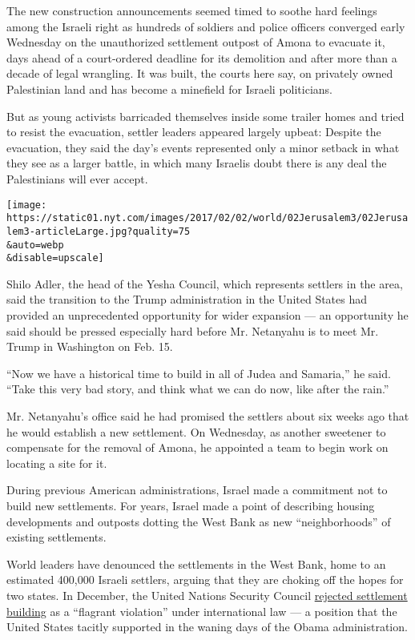 The new construction announcements seemed timed to soothe hard feelings
among the Israeli right as hundreds of soldiers and police officers
converged early Wednesday on the unauthorized settlement outpost of
Amona to evacuate it, days ahead of a court-ordered deadline for its
demolition and after more than a decade of legal wrangling. It was
built, the courts here say, on privately owned Palestinian land and has
become a minefield for Israeli politicians.

But as young activists barricaded themselves inside some trailer homes
and tried to resist the evacuation, settler leaders appeared largely
upbeat: Despite the evacuation, they said the day's events represented
only a minor setback in what they see as a larger battle, in which many
Israelis doubt there is any deal the Palestinians will ever accept.

\texttt{[image: https://static01.nyt.com/images/2017/02/02/world/02Jerusalem3/02Jerusalem3-articleLarge.jpg?quality=75\\\&auto=webp\\\&disable=upscale]}

Shilo Adler, the head of the Yesha Council, which represents settlers in
the area, said the transition to the Trump administration in the United
States had provided an unprecedented opportunity for wider expansion ---
an opportunity he said should be pressed especially hard before Mr.
Netanyahu is to meet Mr. Trump in Washington on Feb. 15.

``Now we have a historical time to build in all of Judea and Samaria,''
he said. ``Take this very bad story, and think what we can do now, like
after the rain.''

Mr. Netanyahu's office said he had promised the settlers about six weeks
ago that he would establish a new settlement. On Wednesday, as another
sweetener to compensate for the removal of Amona, he appointed a team to
begin work on locating a site for it.

During previous American administrations, Israel made a commitment not
to build new settlements. For years, Israel made a point of describing
housing developments and outposts dotting the West Bank as new
``neighborhoods'' of existing settlements.

World leaders have denounced the settlements in the West Bank, home to
an estimated 400,000 Israeli settlers, arguing that they are choking off
the hopes for two states. In December, the United Nations Security
Council
\href{https://www.nytimes.com/2016/12/23/world/middleeast/israel-settlements-un-vote.html}{rejected
settlement building} as a ``flagrant violation'' under international law
--- a position that the United States tacitly supported in the waning
days of the Obama administration.

